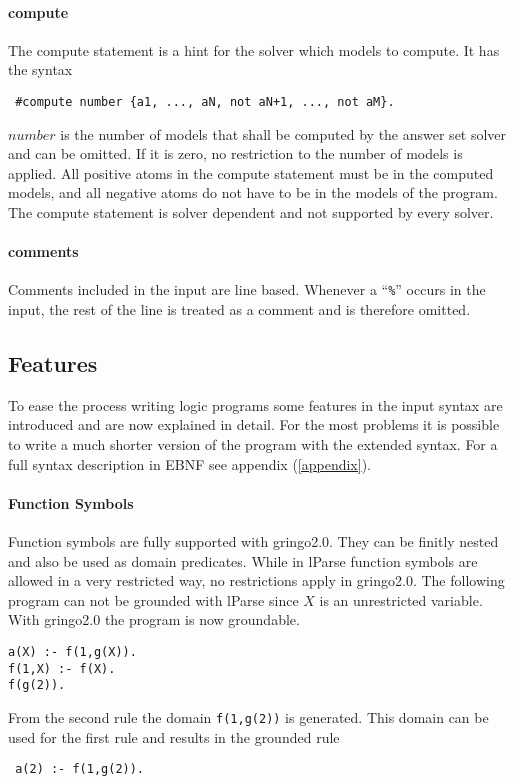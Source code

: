 \documentclass[a4paper,10pt]{article}
\begin{document}
\paragraph{compute}
The compute statement is a hint for the solver which models to compute.
It has the syntax
\begin{verbatim}
 #compute number {a1, ..., aN, not aN+1, ..., not aM}.
\end{verbatim}
$number$ is the number of models that shall be computed by the answer set solver and can be omitted. If it is zero, no restriction to the number of models is applied.
All positive atoms in the compute statement must be in the computed models, and all negative atoms do not have to be in the models of the program.
The compute statement is solver dependent and not supported by every solver.
\paragraph{comments}
Comments included in the input are line based.
Whenever a ``\texttt{\%}'' occurs in the input, the rest of the line is treated as a comment and is therefore omitted.



\subsection{Features}
To ease the process writing logic programs some features in the input syntax are introduced and are now explained in detail.
For the most problems it is possible to write a much shorter version of the program with the extended syntax.
For a full syntax description in EBNF see appendix (\ref{appendix}).
\paragraph{Function Symbols}
Function symbols are fully supported with gringo2.0.
They can be finitly nested and also be used as domain predicates.
While in lParse function symbols are allowed in a very restricted way, no restrictions apply in gringo2.0.
The following program can not be grounded with lParse since $X$ is an unrestricted variable. With gringo2.0 the program is now groundable.
\begin{verbatim}
a(X) :- f(1,g(X)).
f(1,X) :- f(X).
f(g(2)).
\end{verbatim}
From the second rule the domain \texttt{f(1,g(2))} is generated.
This domain can be used for the first rule and results in the grounded rule
\begin{verbatim}
 a(2) :- f(1,g(2)).
\end{verbatim}
\end{document}
